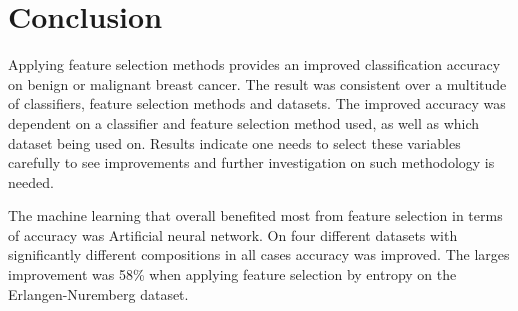 \chapter{Conclusion}



Applying feature selection methods provides an improved classification accuracy on benign or malignant breast cancer. The result was consistent over a multitude of classifiers, feature selection methods and datasets. The improved accuracy was dependent on a classifier and feature selection method used, as well as which dataset being used on. Results indicate one needs to select these variables carefully to see improvements and further investigation on such methodology is needed.

The machine learning that overall benefited most from feature selection in terms of accuracy was Artificial neural network. On four different datasets with significantly different compositions in all cases accuracy was improved. The larges improvement was 58\% when applying feature selection by entropy on the Erlangen-Nuremberg dataset.
